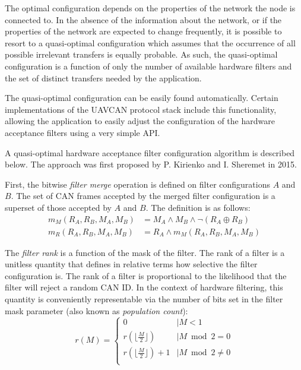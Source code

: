 \begin{remark}[breakable]
    The optimal configuration depends on the properties of the network the node is connected to.
    In the absence of the information about the network,
    or if the properties of the network are expected to change frequently,
    it is possible to resort to a quasi-optimal configuration which assumes that
    the occurrence of all possible irrelevant transfers is equally probable.
    As such, the quasi-optimal configuration is a function of only the number of available hardware filters
    and the set of distinct transfers needed by the application.

    The quasi-optimal configuration can be easily found automatically.
    Certain implementations of the UAVCAN protocol stack include this functionality,
    allowing the application to easily adjust the configuration of the hardware acceptance filters
    using a very simple API.

    A quasi-optimal hardware acceptance filter configuration algorithm is described below.
    The approach was first proposed by P. Kirienko and I. Sheremet in 2015.

    First, the bitwise \emph{filter merge} operation is defined on filter configurations $A$ and $B$.
    The set of CAN frames accepted by the merged filter configuration is a superset of
    those accepted by $A$ and $B$.
    The definition is as follows:
    \begin{equation*}
    \begin{split}
        m_M(R_A, R_B, M_A, M_B) & = M_A \land M_B \land \neg (R_A \oplus R_B) \\
        m_R(R_A, R_B, M_A, M_B) & = R_A \land m_M(R_A, R_B, M_A, M_B)
    \end{split}
    \end{equation*}

    The \emph{filter rank} is a function of the mask of the filter.
    The rank of a filter is a unitless quantity that defines in relative terms how selective the filter
    configuration is.
    The rank of a filter is proportional to the likelihood that the filter will reject a random CAN ID.
    In the context of hardware filtering, this quantity is conveniently representable via the number of bits set in
    the filter mask parameter (also known as \emph{population count}):
    \begin{equation*}
    r(M) =
    \begin{cases}
        0                                   &\mid M < 1 \\
        r(\lfloor\frac{M}{2}\rfloor)        &\mid M \bmod 2 = 0 \\
        r(\lfloor\frac{M}{2}\rfloor) + 1    &\mid M \bmod 2 \neq 0 \\
    \end{cases}
    \end{equation*}


\end{remark}
